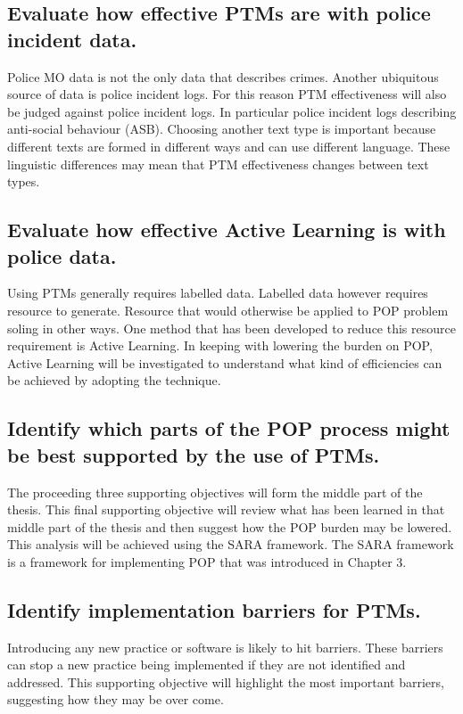 \subsection{Evaluate how effective PTMs are with police incident data.} Police MO data is not the only data that describes crimes. Another ubiquitous source of data is police incident logs. For this reason PTM effectiveness will also be judged against police incident logs. In particular police incident logs describing anti-social behaviour (ASB). Choosing another text type is important because different texts are formed in different ways and can use different language. These linguistic differences may mean that PTM effectiveness changes between text types.  

\subsection{Evaluate how effective Active Learning is with police data.} Using PTMs generally requires labelled data. Labelled data however requires resource to generate. Resource that would otherwise be applied to POP problem soling in other ways. One method that has been developed to reduce this resource requirement is Active Learning.  In keeping with lowering the burden on POP, Active Learning will be investigated to understand what kind of efficiencies can be achieved by adopting the technique.

\subsection{Identify which parts of the POP process might be best supported by the use of PTMs.} The proceeding three supporting objectives will form the middle part of the thesis. This final supporting objective will review what has been learned in that middle part of the thesis and then suggest how the POP burden may be lowered. This analysis will be achieved using the SARA framework. The SARA framework is a framework for implementing POP that was introduced in Chapter 3.

\subsection{Identify implementation barriers for PTMs.} Introducing any new practice or software is likely to hit barriers. These barriers can stop a new practice being implemented if they are not identified and addressed. This  supporting objective will highlight the most important barriers, suggesting how they may be over come.




